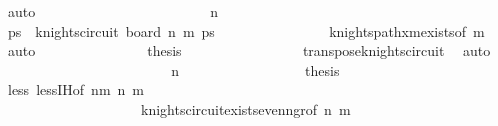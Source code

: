 \begin{isabellebody}
\ auto\isanewline
\ \ \ \ \ \ \ \ \ \ \isamarkupfalse%
\isanewline
\ \ \ \ \ \ \ \ \ \ \ \ \isamarkupfalse%
\ {\isachardoublequoteopen}n{\isacharminus}{\kern0pt}{}\ {\isacharequal}{\kern0pt}\ {}{\isachardoublequoteclose}\isanewline
\ \ \ \ \ \ \ \ \ \ \ \ \isamarkupfalse%
\ \isamarkupfalse%
\ ps\ \ {\isachardoublequoteopen}knights{\isacharunderscore}{\kern0pt}circuit\ {\isacharparenleft}{\kern0pt}board\ {\isacharparenleft}{\kern0pt}n{\isacharminus}{\kern0pt}{}{\isacharparenright}{\kern0pt}\ m{\isacharparenright}{\kern0pt}\ ps{\isachardoublequoteclose}\isanewline
\ \ \ \ \ \ \ \ \ \ \ \ \ \ \isamarkupfalse%
\ knights{\isacharunderscore}{\kern0pt}path{\isacharunderscore}{\kern0pt}{}xm{\isacharunderscore}{\kern0pt}exists{\isacharbrackleft}{\kern0pt}of\ m{\isacharbrackright}{\kern0pt}\ \isamarkupfalse%
\ auto\isanewline
\ \ \ \ \ \ \ \ \ \ \ \ \isamarkupfalse%
\ \isamarkupfalse%
\ {\isacharquery}{\kern0pt}thesis\ \isanewline
\ \ \ \ \ \ \ \ \ \ \ \ \ \ \isamarkupfalse%
\ transpose{\isacharunderscore}{\kern0pt}knights{\isacharunderscore}{\kern0pt}circuit\ \isamarkupfalse%
\ auto\isanewline
\ \ \ \ \ \ \ \ \ \ \isamarkupfalse%
\isanewline
\ \ \ \ \ \ \ \ \ \ \ \ \isamarkupfalse%
\ {\isachardoublequoteopen}n{\isacharminus}{\kern0pt}{}\ {\isasymge}\ {}{}{\isachardoublequoteclose}\isanewline
\ \ \ \ \ \ \ \ \ \ \ \ \isamarkupfalse%
\ \isamarkupfalse%
\ {\isacharquery}{\kern0pt}thesis\ \isanewline
\ \ \ \ \ \ \ \ \ \ \ \ \ \ \isamarkupfalse%
\ less\ less{\isachardot}{\kern0pt}IH{\isacharbrackleft}{\kern0pt}of\ {\isachardoublequoteopen}n{\isacharminus}{\kern0pt}{}{}{\isacharplus}{\kern0pt}m{\isachardoublequoteclose}\ {\isachardoublequoteopen}n{\isacharminus}{\kern0pt}{}{}{\isachardoublequoteclose}\ m{\isacharbrackright}{\kern0pt}\isanewline
\ \ \ \ \ \ \ \ \ \ \ \ \ \ \ \ \ \ \ \ knights{\isacharunderscore}{\kern0pt}circuit{\isacharunderscore}{\kern0pt}exists{\isacharunderscore}{\kern0pt}even{\isacharunderscore}{\kern0pt}n{\isacharunderscore}{\kern0pt}gr{}{}{\isacharbrackleft}{\kern0pt}of\ {\isachardoublequoteopen}n{\isacharminus}{\kern0pt}{}{\isachardoublequoteclose}\ m{\isacharbrackright}{\kern0pt}\ \isamarkupfalse%

\end{isabellebody}
